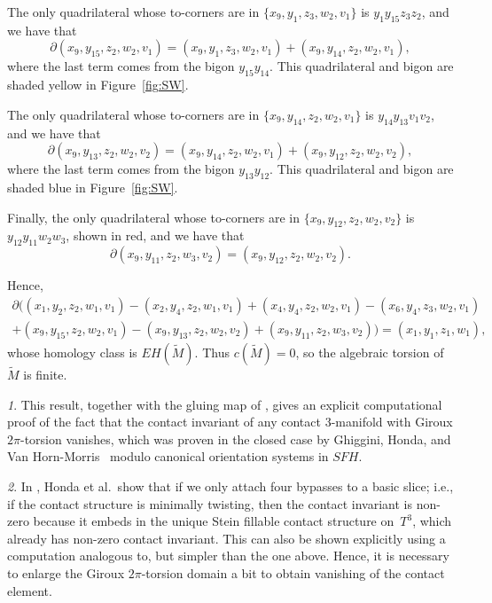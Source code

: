 \documentclass[11pt,oneside,english]{amsart}
\numberwithin{equation}{section}
\numberwithin{figure}{section}
\theoremstyle{definition}
\theoremstyle{plain}
\theoremstyle{plain}
\theoremstyle{remark}
\newtheorem*{rem*}{\protect\remarkname}
\theoremstyle{plain}
\providecommand{\remarkname}{Remark}
\begin{document}
The only quadrilateral whose to-corners are in $\{x_9,y_1,z_3,w_2,v_1\}$
is $y_1y_{15}z_{3}z_{2}$, and we have that
\[
\partial(x_{9},y_{15},z_{2},w_{2},v_1)=(x_9,y_1,z_3,w_2,v_1)+(x_9,y_{14},z_2,w_2,v_1),
\]
where the last term comes from the bigon $y_{15}y_{14}$.
This quadrilateral and bigon are shaded yellow in Figure~\ref{fig:SW}.

The only quadrilateral whose to-corners are in $\{x_9,y_{14},z_2,w_2,v_1\}$
is $y_{14}y_{13}v_1v_2$, and we have that
\[
\partial(x_{9},y_{13},z_{2},w_{2},v_2)=(x_9,y_{14},z_2,w_2,v_1)+(x_9,y_{12},z_2,w_2,v_2),
\]
where the last term comes from the bigon $y_{13}y_{12}$.
This quadrilateral and bigon are shaded blue in Figure~\ref{fig:SW}.

Finally, the only quadrilateral whose to-corners are in $\{x_9,y_{12},z_2,w_2,v_2\}$
is $y_{12}y_{11}w_2w_3$, shown in red, and we have that
\[
\partial(x_{9},y_{11},z_{2},w_{3},v_2)=(x_9,y_{12},z_2,w_2,v_2).
\]

Hence,
\[
\begin{split}
\partial((x_{1},y_{2},z_{2},w_{1},v_1)-(x_{2},y_{4},z_{2},w_{1},v_1)+(x_{4},y_{4},z_{2},w_{2},v_1)-(x_{6},y_{4},z_{3},w_{2},v_1)\\
+ (x_{9},y_{15},z_{2},w_{2},v_1) - (x_{9},y_{13},z_{2},w_{2},v_2) + (x_{9},y_{11},z_{2},w_{3},v_2))=
(x_{1},y_{1},z_{1},w_{1}),
\end{split}
\]
whose homology class is ${\mathit{EH}}(\widetilde{M})$. Thus $c(\widetilde{M})=0$, so the algebraic torsion of $\widetilde{M}$
is finite.

\begin{rem*}
This result, together with the gluing map of \cite{key-2}, gives
an explicit computational proof of the fact that the contact invariant
of any contact $3$-manifold with Giroux $2\pi$-torsion vanishes,
which was proven in the closed case by Ghiggini, Honda, and Van Horn-Morris~\cite{key-5} modulo canonical orientation
systems in ${\mathit{SFH}}$.
\end{rem*}

\begin{rem*}
In \cite[Example 6-(c)]{key-1}, Honda et al.~show that if we only attach four bypasses to a basic slice;
i.e., if the contact structure is minimally twisting,
then the contact invariant is non-zero because it embeds in the unique Stein
fillable contact structure on~$T^{3}$, which already has non-zero
contact invariant. This can also be shown explicitly using a computation analogous to, but simpler
than the one above. Hence, it is necessary to enlarge the Giroux $2\pi$-torsion domain a bit
to obtain vanishing of the contact element.
\end{rem*}
\end{document}
